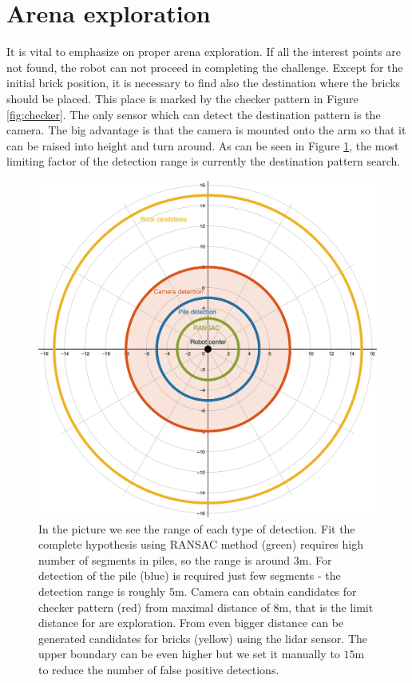 \section{Arena exploration}
It is vital to emphasize on proper arena exploration. If all the interest points are not found, the robot can not proceed in completing the challenge. Except for the initial brick position, it is necessary to find also the destination where the bricks should be placed. This place is marked by the checker pattern in Figure \ref{fig:checker}. The only sensor which can detect the destination pattern is the camera. The big advantage is that the camera is mounted onto the arm so that it can be raised into height and turn around. As can be seen in Figure \ref{fig:detection_range}, the most limiting factor of the detection range is currently the destination pattern search.

\begin{figure}[H]
	\centering
	\includegraphics[scale=0.38]{fig/detection_range.png}
	\caption[Detection ranges]{In the picture we see the range of each type of detection. Fit the complete hypothesis using RANSAC method (green) requires high number of segments in piles, so the range is around $3$m. For detection of the pile (blue) is required just few segments - the detection range is roughly $5$m. Camera can obtain candidates for checker pattern (red) from maximal distance of $8$m, that is the limit distance for are exploration. From even bigger distance can be generated candidates for bricks (yellow) using the lidar sensor. The upper boundary can be even higher but we set it manually to $15$m to reduce the number of false positive detections.}
	\label{fig:detection_range}
\end{figure}

